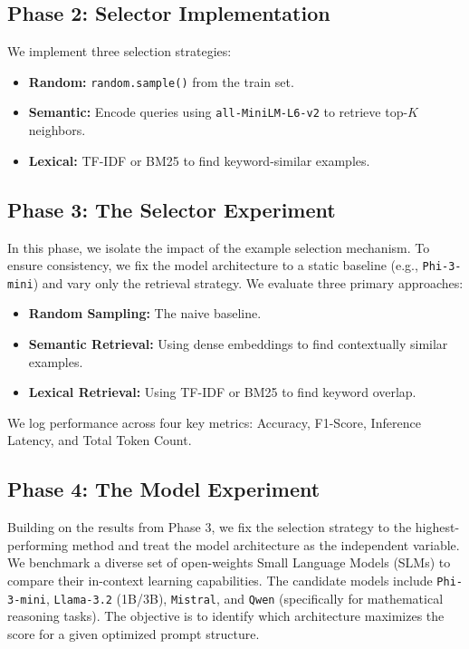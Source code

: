 \documentclass{article}
\begin{document}
\subsection{Phase 2: Selector Implementation}
We implement three selection strategies:
\begin{itemize}
    \item \textbf{Random:} \texttt{random.sample()} from the train set.
    \item \textbf{Semantic:} Encode queries using \texttt{all-MiniLM-L6-v2} to retrieve top-$K$ neighbors.
    \item \textbf{Lexical:} TF-IDF or BM25 to find keyword-similar examples.
\end{itemize}

\subsection{Phase 3: The Selector Experiment}
In this phase, we isolate the impact of the example selection mechanism. To ensure consistency, we fix the model architecture to a static baseline (e.g., \texttt{Phi-3-mini}) and vary only the retrieval strategy. We evaluate three primary approaches:
\begin{itemize}
    \item \textbf{Random Sampling:} The naive baseline.
    \item \textbf{Semantic Retrieval:} Using dense embeddings to find contextually similar examples.
    \item \textbf{Lexical Retrieval:} Using TF-IDF or BM25 to find keyword overlap.
\end{itemize}
We log performance across four key metrics: Accuracy, F1-Score, Inference Latency, and Total Token Count.

\subsection{Phase 4: The Model Experiment}
Building on the results from Phase 3, we fix the selection strategy to the highest-performing method and treat the model architecture as the independent variable. We benchmark a diverse set of open-weights Small Language Models (SLMs) to compare their in-context learning capabilities. The candidate models include \texttt{Phi-3-mini}, \texttt{Llama-3.2} (1B/3B), \texttt{Mistral}, and \texttt{Qwen} (specifically for mathematical reasoning tasks). The objective is to identify which architecture maximizes the score for a given optimized prompt structure.
\end{document}
